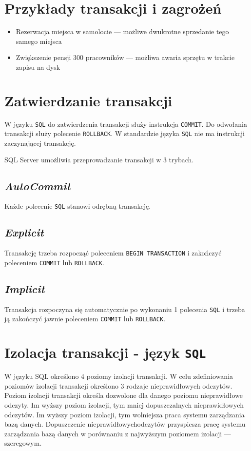 \documentclass[a4paper]{article}
\begin{document}
\section{Przykłady transakcji i zagrożeń}
\begin{itemize}
    \item Rezerwacja miejsca w samolocie --- możliwe dwukrotne sprzedanie tego samego miejsca
    \item Zwiększenie pensji 300 pracowników --- możliwa awaria sprzętu w trakcie zapisu na dysk
\end{itemize}
\section{Zatwierdzanie transakcji}
W języku {\tt SQL} do zatwierdzenia transakcji służy instrukcja {\tt COMMIT}.
Do odwołania transakcji służy polecenie {\tt ROLLBACK}.
W standardzie języka {\tt SQL} nie ma instrukcji zaczynającej transakcję.

SQL Server umożliwia przeprowadzanie transakcji w 3 trybach.
\subsection{\em AutoCommit}
Każde polecenie {\tt SQL} stanowi odrębną transakcję.
\subsection{\em Explicit}
Transakcję trzeba rozpocząć poleceniem \texttt{BEGIN TRANSACTION} i zakończyć poleceniem \texttt{COMMIT} lub \texttt{ROLLBACK}.
\subsection{\em Implicit}
Transakcja rozpoczyna się automatycznie po wykonaniu 1 polecenia {\tt SQL} i trzeba ją zakończyć jawnie poleceniem \texttt{COMMIT} lub \texttt{ROLLBACK}.
\pagebreak
\section{Izolacja transakcji - język {\tt SQL}}
W języku SQL określono 4 poziomy izolacji transakcji.
W celu zdefiniowania poziomów izolacji transakcji określono 3 rodzaje nieprawidłowych odczytów.
Poziom izolacji transakcji określa dozwolone dla danego poziomu nieprawidłowe odczyty.
Im wyższy poziom izolacji, tym mniej dopuszczalnych nieprawidłowych odczytów.
Im wyższy poziom izolacji, tym wolniejsza praca systemu zarządzania bazą danych.
Dopuszczenie nieprawidłowychodczytów przyspiesza pracę systemu zarządzania bazą danych w porównaniu z najwyższym poziomem izolacji --- szeregowym.
\end{document}
